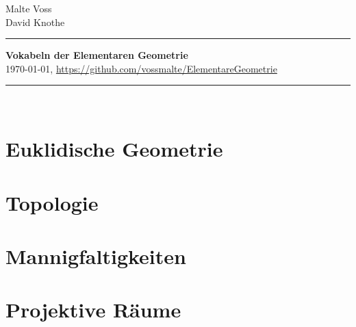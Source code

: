 \documentclass[a4paper,11pt]{article} %
\theoremstyle{costum} %
\begin{document}
%
\hfill \parbox{24mm}
{
Malte Voss\\
David Knothe\\
}

\rule{\textwidth}{1pt}                                   %
%
\begin{center}
\textbf{
Vokabeln der Elementaren Geometrie \\[1ex] %
}
{
%
%
\today, \url{https://github.com/vossmalte/ElementareGeometrie}
}
\end{center}
%
\rule{\textwidth}{1pt}\\                                 %
\section{Euklidische Geometrie}

\vspace{3ex}
\section{Topologie}

\vspace{3ex}
\section{Mannigfaltigkeiten}

\vspace{3ex}
\section{Projektive Räume}

\vspace{3ex}
\end{document}
